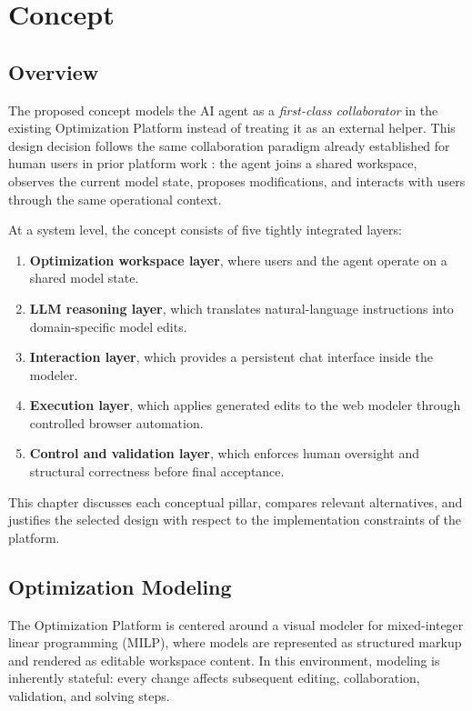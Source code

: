 \chapter{Concept}

\section{Overview}
The proposed concept models the AI agent as a \emph{first-class collaborator} in the existing Optimization Platform instead of treating it as an external helper. This design decision follows the same collaboration paradigm already established for human users in prior platform work \cite{MarkoThesisMsc, DeniThesisMsc, MarkoThesisBsc, MaksimThesisMsc}: the agent joins a shared workspace, observes the current model state, proposes modifications, and interacts with users through the same operational context.

At a system level, the concept consists of five tightly integrated layers:
\begin{enumerate}
    \item \textbf{Optimization workspace layer}, where users and the agent operate on a shared model state.
    \item \textbf{LLM reasoning layer}, which translates natural-language instructions into domain-specific model edits.
    \item \textbf{Interaction layer}, which provides a persistent chat interface inside the modeler.
    \item \textbf{Execution layer}, which applies generated edits to the web modeler through controlled browser automation.
    \item \textbf{Control and validation layer}, which enforces human oversight and structural correctness before final acceptance.
\end{enumerate}

This chapter discusses each conceptual pillar, compares relevant alternatives, and justifies the selected design with respect to the implementation constraints of the platform.

\section{Optimization Modeling}
The Optimization Platform is centered around a visual modeler for mixed-integer linear programming (MILP), where models are represented as structured markup and rendered as editable workspace content. In this environment, modeling is inherently stateful: every change affects subsequent editing, collaboration, validation, and solving steps.

